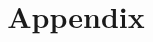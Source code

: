 \documentclass[a4paper,english]{report}
\begin{document}
\title{Appendix}

\maketitle
\tableofcontents

\end{document}
